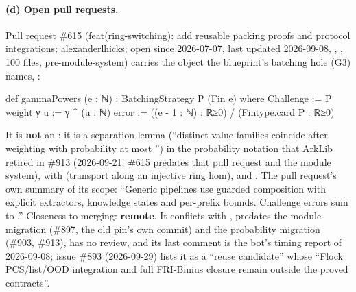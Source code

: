 \paragraph{(d) Open pull requests.}
Pull request \#615 (feat(ring-switching): add reusable packing proofs and protocol integrations;
alexanderlhicks; open since 2026-07-07, last updated 2026-09-08, ,
, 100 files, pre-module-system) carries the object the
blueprint's batching hole (G3) names, :
\begin{leancode}
def gammaPowers (e : ℕ) : BatchingStrategy P (Fin e) where
  Challenge := P
  weight γ u := γ ^ (u : ℕ)
  error := ((e - 1 : ℕ) : ℝ≥0) / (Fintype.card P : ℝ≥0)
\end{leancode}
It is \textbf{not} an : it is a separation lemma (``distinct value
families coincide after weighting with probability at most '') in the 
probability notation that ArkLib retired in \#913 (2026-09-21; \#615 predates that pull request
and the module system), with  (transport along an injective ring hom),
 and . The pull request's own summary of its scope: ``Generic
pipelines use guarded composition with explicit extractors, knowledge states and per-prefix
bounds. Challenge errors sum to .'' Closeness to merging:
\textbf{remote}. It conflicts with , predates the module migration (\#897, the old
pin's own commit) and the probability migration (\#903, \#913), has no review, and its last
comment is the bot's timing report of 2026-09-08; issue \#893 (2026-09-29) lists it as a ``reuse
candidate'' whose ``Flock PCS/list/OOD integration and full FRI-Binius closure remain outside the
proved contracts''.

